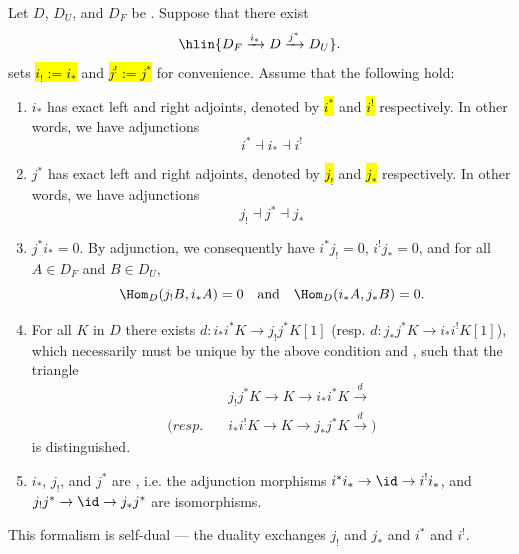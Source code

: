 \begin{context} \label{context:general_gluing_framework_for_t_structures_on_triangulated_categories}
    Let $D$, $D_U$, and $D_F$ be . Suppose that there exist 
    $$\hlin{D_F \xrightarrow{i_*} D \xrightarrow{j^*} D_U}.$$
    \cite{beilinson_berstein_deligne_atlesI} sets \hl{$i_! := i_*$} and \hl{$j^! := j^*$} for convenience. Assume that the following hold:
    \begin{enumerate}
        \item $i_*$ has exact left and right adjoints, denoted by \hl{$i^*$} and \hl{$i^!$} respectively. In other words, we have adjunctions
        $$i^* \dashv i_* \dashv i^!$$
        \item $j^*$ has exact left and right adjoints, denoted by \hl{$j_!$} and \hl{$j_*$} respectively. In other words, we have adjunctions
        $$j_! \dashv j^* \dashv j_*$$
        \item $j^* i_* = 0$. By adjunction, we consequently have $i^* j_! = 0$, $i^! j_* = 0$, and for all $A \in D_F$ and $B \in D_U$,
        $$\Hom_D(j_! B, i_* A) = 0 \quad \text{and} \quad \Hom_D(i_*A, j_* B) = 0.$$
        \item For all $K$ in $D$ there exists $d: i_* i^* K \to j_! j^* K[1]$ (resp. $d: j_* j^* K \to i_* i^! K[1]$), which necessarily must be unique by the above condition and , such that the triangle
        \begin{align*}
            &j_! j^* K \to K \to i_* i^* K \xrightarrow{d} \\
            (resp. \quad & i_* i^! K \to K \to j_* j^* K \xrightarrow{d})
        \end{align*}
        is distinguished.

        \item $i_*$, $j_!$, and $j^*$ are , i.e. the adjunction morphisms $i^* i_* \to \id \to i^! i_*$, and $j_! j^* \to \id \to j_* j^*$ are isomorphisms.

    \end{enumerate}
    This formalism is self-dual --- the duality exchanges $j_!$ and $j_*$ and $i^*$ and $i^!$.
\end{context}